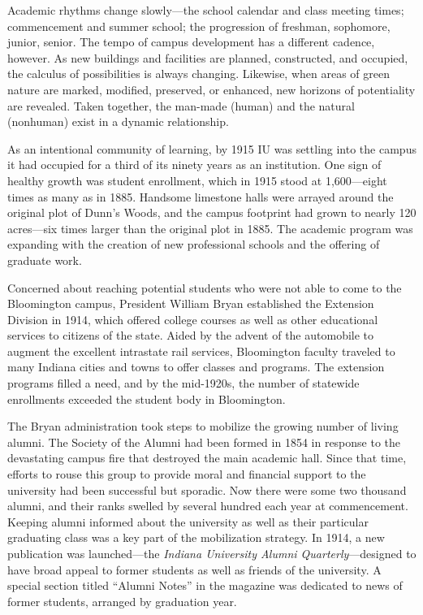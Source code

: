 \documentclass[
  american,
  letterpaper,
]{scrreprt}
\begin{document}
Academic rhythms change slowly---the school calendar and class meeting
times; commencement and summer school; the progression of freshman,
sophomore, junior, senior. The tempo of campus development has a
different cadence, however. As new buildings and facilities are planned,
constructed, and occupied, the calculus of possibilities is always
changing. Likewise, when areas of green nature are marked, modified,
preserved, or enhanced, new horizons of potentiality are revealed. Taken
together, the man-made (human) and the natural (nonhuman) exist in a
dynamic relationship.

As an intentional community of learning, by 1915 IU was settling into
the campus it had occupied for a third of its ninety years as an
institution. One sign of healthy growth was student enrollment, which in
1915 stood at 1,600---eight times as many as in 1885. Handsome limestone
halls were arrayed around the original plot of Dunn's Woods, and the
campus footprint had grown to nearly 120 acres---six times larger than
the original plot in 1885. The academic program was expanding with the
creation of new professional schools and the offering of graduate work.

Concerned about reaching potential students who were not able to come to
the Bloomington campus, President William Bryan established the
Extension Division in 1914, which offered college courses as well as
other educational services to citizens of the state. Aided by the advent
of the automobile to augment the excellent intrastate rail services,
Bloomington faculty traveled to many Indiana cities and towns to offer
classes and programs. The extension programs filled a need, and by the
mid-1920s, the number of statewide enrollments exceeded the student body
in Bloomington.

The Bryan administration took steps to mobilize the growing number of
living alumni. The Society of the Alumni had been formed in 1854 in
response to the devastating campus fire that destroyed the main academic
hall. Since that time, efforts to rouse this group to provide moral and
financial support to the university had been successful but sporadic.
Now there were some two thousand alumni, and their ranks swelled by
several hundred each year at commencement. Keeping alumni informed about
the university as well as their particular graduating class was a key
part of the mobilization strategy. In 1914, a new publication was
launched---the \emph{Indiana University Alumni Quarterly}---designed to
have broad appeal to former students as well as friends of the
university. A special section titled ``Alumni Notes'' in the magazine
was dedicated to news of former students, arranged by graduation year.
\end{document}
